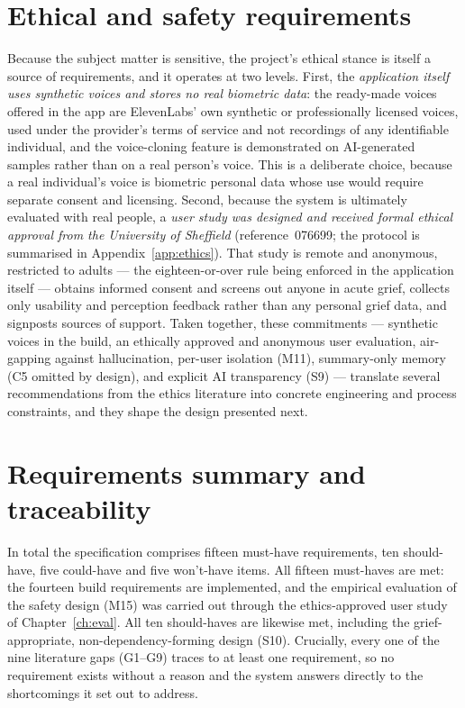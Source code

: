 \documentclass[11pt,a4paper]{report}
\begin{document}
\section{Ethical and safety requirements}
\label{sec:ethics-req}
Because the subject matter is sensitive, the project's ethical stance is itself a source of requirements, and it operates at two levels. First, the \emph{application itself uses synthetic voices and stores no real biometric data}: the ready-made voices offered in the app are ElevenLabs' own synthetic or professionally licensed voices, used under the provider's terms of service and not recordings of any identifiable individual, and the voice-cloning feature is demonstrated on AI-generated samples rather than on a real person's voice. This is a deliberate choice, because a real individual's voice is biometric personal data whose use would require separate consent and licensing. Second, because the system is ultimately evaluated with real people, a \emph{user study was designed and received formal ethical approval from the University of Sheffield} (reference~076699; the protocol is summarised in Appendix~\ref{app:ethics}). That study is remote and anonymous, restricted to adults --- the eighteen-or-over rule being enforced in the application itself --- obtains informed consent and screens out anyone in acute grief, collects only usability and perception feedback rather than any personal grief data, and signposts sources of support. Taken together, these commitments --- synthetic voices in the build, an ethically approved and anonymous user evaluation, air-gapping against hallucination, per-user isolation (M11), summary-only memory (C5 omitted by design), and explicit AI transparency (S9) --- translate several recommendations from the ethics literature \cite{hollanek2024griefbots,ohman2018ethical} into concrete engineering and process constraints, and they shape the design presented next.

\section{Requirements summary and traceability}
In total the specification comprises fifteen must-have requirements, ten should-have, five could-have and five won't-have items. All fifteen must-haves are met: the fourteen build requirements are implemented, and the empirical evaluation of the safety design (M15) was carried out through the ethics-approved user study of Chapter~\ref{ch:eval}. All ten should-haves are likewise met, including the grief-appropriate, non-dependency-forming design (S10). Crucially, every one of the nine literature gaps (G1--G9) traces to at least one requirement, so no requirement exists without a reason and the system answers directly to the shortcomings it set out to address.
\end{document}
